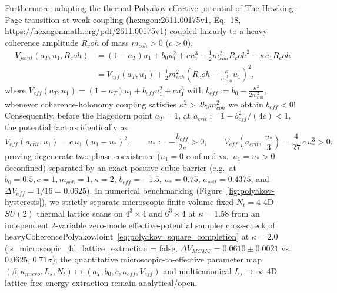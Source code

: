 \documentclass[american,11pt,letterpaper]{article}
\newcommand{\Rcoh}{R_{\mathrm{coh}}}
\def\mathrm#1{#1}%
\def\texttt#1{#1}%
\def\emph#1{#1}%
\def\Rcoh{R_coh}%
\begin{document}
Furthermore, adapting the thermal Polyakov effective potential of \emph{The Hawking--Page transition at weak coupling} (\texttt{hexagon:2611.00175v1}, Eq.~18, \url{https://hexagonmath.org/pdf/2611.00175v1}) coupled linearly to a heavy coherence amplitude $\Rcoh$ of mass $m_{\mathrm{coh}} > 0$ ($c > 0$),
\begin{align}
V_{\mathrm{joint}}(a_T, u_1, \Rcoh)
&= (1 - a_T)u_1 + b_0 u_1^2 + c u_1^3 + \frac{1}{2}m_{\mathrm{coh}}^2\Rcoh^2 - \kappa u_1\Rcoh \nonumber\\
&= V_{\mathrm{eff}}(a_T, u_1) + \frac{1}{2}m_{\mathrm{coh}}^2\left(\Rcoh - \frac{\kappa}{m_{\mathrm{coh}}^2}u_1\right)^2,
\label{eq:polyakov_square_completion}
\end{align}
where $V_{\mathrm{eff}}(a_T, u_1) = (1 - a_T)u_1 + b_{\mathrm{eff}} u_1^2 + c u_1^3$ with $b_{\mathrm{eff}} := b_0 - \frac{\kappa^2}{2 m_{\mathrm{coh}}^2}$, whenever coherence-holonomy coupling satisfies $\kappa^2 > 2 b_0 m_{\mathrm{coh}}^2$ we obtain $b_{\mathrm{eff}} < 0$! Consequently, before the Hagedorn point $a_T = 1$, at $a_{\mathrm{crit}} := 1 - b_{\mathrm{eff}}^2/(4c) < 1$, the potential factors identically as
\begin{equation}
V_{\mathrm{eff}}(a_{\mathrm{crit}}, u_1) = c\,u_1\,(u_1 - u_*)^2,
\qquad
u_* := -\frac{b_{\mathrm{eff}}}{2c} > 0,
\qquad
V_{\mathrm{eff}}\!\left(a_{\mathrm{crit}},\,\frac{u_*}{3}\right) = \frac{4}{27}\,c\,u_*^3 > 0,
\label{eq:polyakov_barrier_exact_sec53}
\end{equation}
proving degenerate two-phase coexistence ($u_1 = 0$ confined vs.\ $u_1 = u_* > 0$ deconfined) separated by an exact positive cubic barrier (e.g.\ at $b_0 = 0.5, c = 1, m_{\mathrm{coh}} = 1, \kappa = 2$, $b_{\mathrm{eff}} = -1.5$, $u_* = 0.75$, $a_{\mathrm{crit}} = 0.4375$, and $\Delta V_{\mathrm{eff}} = 1/16 = 0.0625$). In numerical benchmarking (Figure~\ref{fig:polyakov-hysteresis}), we strictly separate microscopic finite-volume fixed-$N_t = 4$ 4D $SU(2)$ thermal lattice scans on $4^3\times 4$ and $6^3\times 4$ at $\kappa = 1.58$ from an independent 2-variable zero-mode effective-potential sampler cross-check of \texttt{heavy\allowbreak{}Coherence\allowbreak{}Polyakov\allowbreak{}Joint}~\eqref{eq:polyakov_square_completion} at $\kappa = 2.0$ (\texttt{is\_\allowbreak{}microscopic\_\allowbreak{}4d\_\allowbreak{}lattice\_\allowbreak{}extraction = false}, $\Delta V_{\mathrm{MCMC}} = 0.0610 \pm 0.0021$ vs.\ $0.0625$, $0.71\sigma$); the quantitative microscopic-to-effective parameter map $(\beta, \kappa_{\mathrm{micro}}, L_s, N_t) \mapsto (a_T, b_0, c, \kappa_{\mathrm{eff}}, V_{\mathrm{eff}})$ and multicanonical $L_s \to \infty$ 4D lattice free-energy extraction remain analytical/open.
\end{document}
